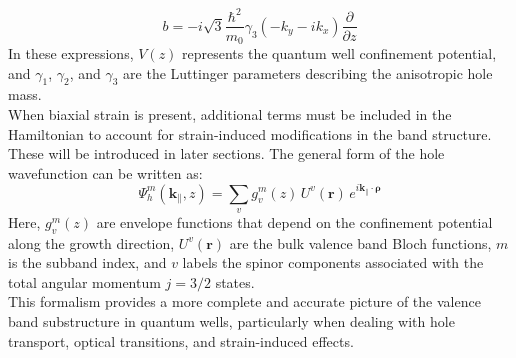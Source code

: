 \begin{equation}
	b = -i \sqrt{3} \frac{\hbar^2}{m_0} \gamma_3 (- k_y - i k_x) \frac{\partial}{\partial z}
\end{equation}
In these expressions, $V(z)$ represents the quantum well confinement potential, and $\gamma_1$, $\gamma_2$, and $\gamma_3$ are the Luttinger parameters describing the anisotropic hole mass.\\
When biaxial strain is present, additional terms must be included in the Hamiltonian to account for strain-induced modifications in the band structure. These will be introduced in later sections.
The general form of the hole wavefunction can be written as:
\begin{equation}
	\Psi^m_{h}(\mathbf{k}_\parallel,z) = \sum_v g^m_v(z) \, U^v(\mathbf{r}) \, e^{i \mathbf{k}_\parallel \cdot \boldsymbol{\rho}}
\end{equation}
Here, $g^m_v(z)$ are envelope functions that depend on the confinement potential along the growth direction, $U^v(\mathbf{r})$ are the bulk valence band Bloch functions, $m$ is the subband index, and $v$ labels the spinor components associated with the total angular momentum $j = 3/2$ states.\\
This formalism provides a more complete and accurate picture of the valence band substructure in quantum wells, particularly when dealing with hole transport, optical transitions, and strain-induced effects.


